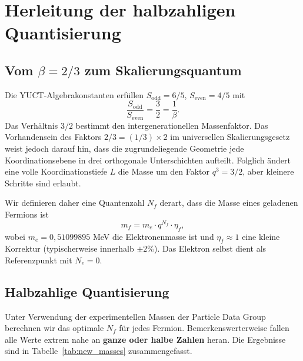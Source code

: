 \documentclass[12pt,a4paper]{article}
\newcommand{\Sodd}{S_{\mathrm{odd}}}
\newcommand{\Seven}{S_{\mathrm{even}}}
\begin{document}
	\section{Herleitung der halbzahligen Quantisierung}
	
	\subsection{Vom \(\beta = 2/3\) zum Skalierungsquantum}
	
	Die YUCT-Algebrakonstanten erfüllen \(\Sodd = 6/5\), \(\Seven = 4/5\) mit
	\[
	\frac{\Sodd}{\Seven} = \frac{3}{2} = \frac{1}{\beta}.
	\]
	Das Verhältnis \(3/2\) bestimmt den intergenerationellen Massenfaktor. Das Vorhandensein des Faktors \(2/3 = (1/3) \times 2\) im universellen Skalierungsgesetz weist jedoch darauf hin, dass die zugrundeliegende Geometrie jede Koordinationsebene in drei orthogonale Unterschichten aufteilt. Folglich ändert eine volle Koordinationstiefe \(L\) die Masse um den Faktor \(q^3 = 3/2\), aber kleinere Schritte sind erlaubt.
	
	Wir definieren daher eine Quantenzahl \(N_f\) derart, dass die Masse eines geladenen Fermions ist
	\begin{equation}
		m_f = m_e \cdot q^{N_f} \cdot \eta_f,
		\label{eq:new}
	\end{equation}
	wobei \(m_e = 0,51099895\) MeV die Elektronenmasse ist und \(\eta_f \approx 1\) eine kleine Korrektur (typischerweise innerhalb \(\pm 2\%\)). Das Elektron selbst dient als Referenzpunkt mit \(N_e = 0\).
	
	\subsection{Halbzahlige Quantisierung}
	
	Unter Verwendung der experimentellen Massen der Particle Data Group~\cite{PDG2024} berechnen wir das optimale \(N_f\) für jedes Fermion. Bemerkenswerterweise fallen alle Werte extrem nahe an \textbf{ganze oder halbe Zahlen} heran. Die Ergebnisse sind in Tabelle~\ref{tab:new_masses} zusammengefasst.
	
\end{document}
